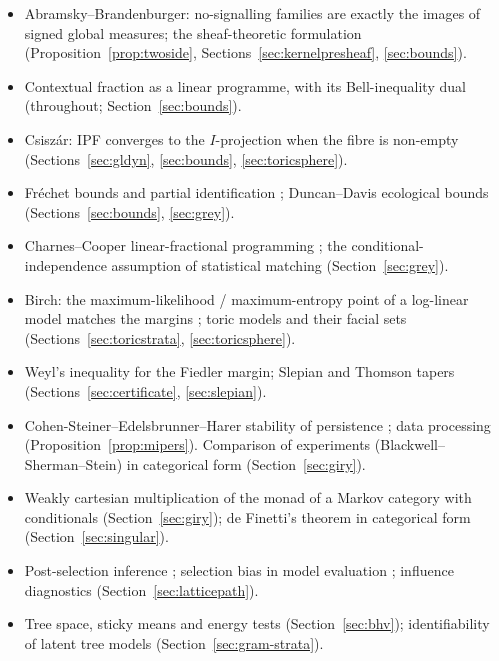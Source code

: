\documentclass[11pt]{article}
\theoremstyle{definition}
\theoremstyle{remark}
\begin{document}
\begin{itemize}[itemsep=0pt]
  \item Abramsky--Brandenburger: no-signalling families are exactly the images of signed global measures; the sheaf-theoretic formulation \cite{ab11} (Proposition~\ref{prop:twoside}, Sections~\ref{sec:kernelpresheaf}, \ref{sec:bounds}).
  \item Contextual fraction as a linear programme, with its Bell-inequality dual \cite{abm17} (throughout; Section~\ref{sec:bounds}).
  \item Csisz\'ar: IPF converges to the $I$-projection when the fibre is non-empty \cite{csiszar} (Sections~\ref{sec:gldyn}, \ref{sec:bounds}, \ref{sec:toricsphere}).
  \item Fr\'echet bounds and partial identification \cite{frechet51,manski03}; Duncan--Davis ecological bounds \cite{duncandavis53} (Sections~\ref{sec:bounds}, \ref{sec:grey}).
  \item Charnes--Cooper linear-fractional programming \cite{charnescooper}; the conditional-independence assumption of statistical matching \cite{dorazio06} (Section~\ref{sec:grey}).
  \item Birch: the maximum-likelihood / maximum-entropy point of a log-linear model matches the margins \cite{birch63}; toric models and their facial sets \cite{gms06,fr12,efrs06} (Sections~\ref{sec:toricstrata}, \ref{sec:toricsphere}).
  \item Weyl's inequality for the Fiedler margin; Slepian and Thomson tapers \cite{slepian,thomson} (Sections~\ref{sec:certificate}, \ref{sec:slepian}).
  \item Cohen-Steiner--Edelsbrunner--Harer stability of persistence \cite{ceh}; data processing (Proposition~\ref{prop:mipers}). Comparison of experiments (Blackwell--Sherman--Stein) in categorical form \cite{fgpr20} (Section~\ref{sec:giry}).
  \item Weakly cartesian multiplication of the monad of a Markov category with conditionals \cite{bohinenperrone25} (Section~\ref{sec:giry}); de Finetti's theorem in categorical form \cite{fgp21} (Section~\ref{sec:singular}).
  \item Post-selection inference \cite{cox75,posi,fithian}; selection bias in model evaluation \cite{varma06,cawley10}; influence diagnostics \cite{cook77,bkw80} (Section~\ref{sec:latticepath}).
  \item Tree space, sticky means and energy tests \cite{bhv,hotz,szekely} (Section~\ref{sec:bhv}); identifiability of latent tree models \cite{amr09} (Section~\ref{sec:gram-strata}).

\end{itemize}
\end{document}
